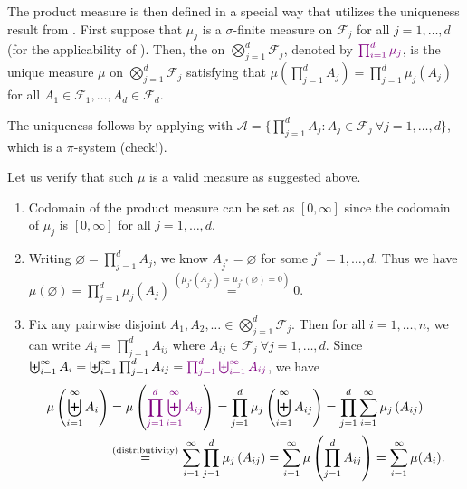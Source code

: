 \begin{enumerate}
The product measure is then defined in a special way that utilizes the
uniqueness result from .  First suppose that \(\mu_j\) is
a \(\sigma\)-finite measure on \(\mathcal{F}_j\) for all \(j=1,\dotsc,d\) (for
the applicability of ). Then, the   on \(\bigotimes_{j=1}^{d}\mathcal{F}_j\), denoted by \({\color{violet}\prod_{i=1}^{d}\mu_j}\),
is the unique measure \(\mu\) on \(\bigotimes_{j=1}^{d}\mathcal{F}_j\)
satisfying that \(\mu(\prod_{j=1}^{d}A_j)=\prod_{j=1}^{d}\mu_j(A_j)\) for all
\(A_1\in\mathcal{F}_1,\dotsc,A_d\in\mathcal{F}_d\). \begin{note}
The uniqueness follows by applying  with
\(\mathcal{A}=\{\prod_{j=1}^{d}A_j:A_j\in\mathcal{F}_j~\forall
j=1,\dotsc,d\}\), which is a \(\pi\)-system (check!).
\end{note}

Let us verify that such \(\mu\) is a valid measure as suggested above.

\begin{pf}
\begin{enumerate}[label={(\arabic*)}]
\item Codomain of the product measure can be set as \([0,\infty]\) since the
codomain of \(\mu_j\) is \([0,\infty]\) for all \(j=1,\dotsc,d\).
\item Writing \(\varnothing=\prod_{j=1}^{d}A_j\), we know
\(A_{j^*}=\varnothing\) for some \(j^*=1,\dotsc,d\). Thus we have
\(\mu(\varnothing)=\prod_{j=1}^{d}\mu_j(A_j)
\overset{(\mu_{j^{*}}(A_{j^{*}})=\mu_{j^{*}}(\varnothing)=0)}{=}0\).
\item Fix any pairwise disjoint
\(A_1,A_2,\dotsc\in\bigotimes_{j=1}^{d}\mathcal{F}_j\). Then for all
\(i=1,\dotsc,n\), we can write \(A_i=\prod_{j=1}^{d}A_{ij}\) where \(A_{ij}\in\mathcal{F}_j~\forall j=1,\dotsc,d\).
Since \(\biguplus_{i=1}^{\infty}A_i=\biguplus_{i=1}^{\infty}\prod_{j=1}^{d}A_{ij}
={\color{violet}\prod_{j=1}^{d}\biguplus_{i=1}^{\infty}A_{ij}}\), we have
\begin{align*}
\mu\left(\biguplus_{i=1}^{\infty}A_i\right)
&=\mu\left({\color{violet}\prod_{j=1}^{d}\biguplus_{i=1}^{\infty}A_{ij}}\right)
=\prod_{j=1}^{d}\mu_j\left(\biguplus_{i=1}^{\infty}A_{ij}\right)
=\prod_{j=1}^{d}\sum_{i=1}^{\infty}\mu_j\left(A_{ij}\right) \\
&\overset{\text{(distributivity)}}{=}\sum_{i=1}^{\infty}\prod_{j=1}^{d}\mu_j\left(A_{ij}\right)
=\sum_{i=1}^{\infty}\mu\left(\prod_{j=1}^{d}A_{ij}\right)
=\sum_{i=1}^{\infty}\mu(A_i).
\end{align*}
\end{enumerate}
\end{pf}
\end{enumerate}
